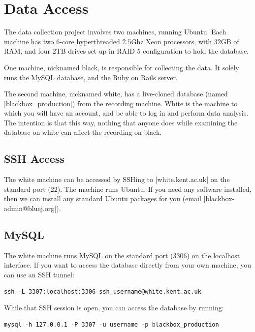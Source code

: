 \documentclass{report}
\begin{document}
\chapter{Data Access}
\label{sec:data_access}

The data collection project involves two machines, running Ubuntu.  Each
machine has two 6-core hyperthreaded 2.5Ghz Xeon processors, with 32GB of RAM,
and four 2TB drives set up in RAID 5 configuration to hold the database.

One machine, nicknamed black, is
responsible for collecting the data.  It solely runs the MySQL database, and
the Ruby on Rails server.  

The second machine, nicknamed white, has a live-cloned database (named |blackbox_production|) from the recording
machine.  White is the machine to which you will have an account, and be able
to log in and perform data analysis.  The intention is that this way, nothing
that anyone does while examining the database on white can affect the
recording on black.

\section{SSH Access}

The white machine can be accessed by SSHing to |white.kent.ac.uk| on the
standard port (22).  The machine runs Ubuntu.  If you need any software
installed, then we can install any standard Ubuntu packages for you (email
|blackbox-admin@bluej.org|).

\section{MySQL}
\label{sec:ssh-tunnel}

The white machine runs MySQL on the standard port (3306) on the localhost
interface.  If you want to access the database directly from your own machine,
you can use an SSH tunnel:

\begin{lstlisting}
ssh -L 3307:localhost:3306 ssh_username@white.kent.ac.uk
\end{lstlisting}

While that SSH session is open, you can access the database by running:

\begin{lstlisting}
mysql -h 127.0.0.1 -P 3307 -u username -p blackbox_production
\end{lstlisting}
\end{document}
